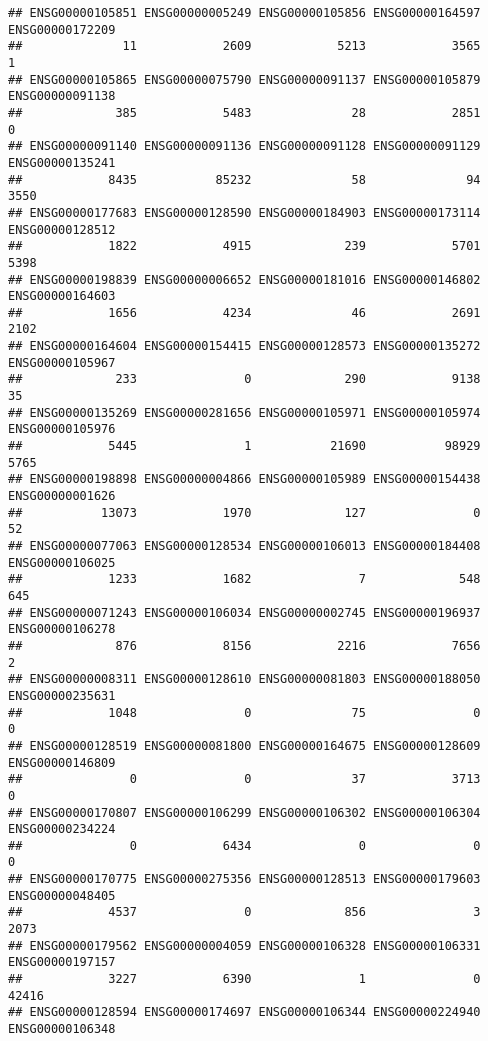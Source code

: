 \documentclass[
]{article}
\begin{document}
\begin{verbatim}
## ENSG00000105851 ENSG00000005249 ENSG00000105856 ENSG00000164597 ENSG00000172209 
##              11            2609            5213            3565               1 
## ENSG00000105865 ENSG00000075790 ENSG00000091137 ENSG00000105879 ENSG00000091138 
##             385            5483              28            2851               0 
## ENSG00000091140 ENSG00000091136 ENSG00000091128 ENSG00000091129 ENSG00000135241 
##            8435           85232              58              94            3550 
## ENSG00000177683 ENSG00000128590 ENSG00000184903 ENSG00000173114 ENSG00000128512 
##            1822            4915             239            5701            5398 
## ENSG00000198839 ENSG00000006652 ENSG00000181016 ENSG00000146802 ENSG00000164603 
##            1656            4234              46            2691            2102 
## ENSG00000164604 ENSG00000154415 ENSG00000128573 ENSG00000135272 ENSG00000105967 
##             233               0             290            9138              35 
## ENSG00000135269 ENSG00000281656 ENSG00000105971 ENSG00000105974 ENSG00000105976 
##            5445               1           21690           98929            5765 
## ENSG00000198898 ENSG00000004866 ENSG00000105989 ENSG00000154438 ENSG00000001626 
##           13073            1970             127               0              52 
## ENSG00000077063 ENSG00000128534 ENSG00000106013 ENSG00000184408 ENSG00000106025 
##            1233            1682               7             548             645 
## ENSG00000071243 ENSG00000106034 ENSG00000002745 ENSG00000196937 ENSG00000106278 
##             876            8156            2216            7656               2 
## ENSG00000008311 ENSG00000128610 ENSG00000081803 ENSG00000188050 ENSG00000235631 
##            1048               0              75               0               0 
## ENSG00000128519 ENSG00000081800 ENSG00000164675 ENSG00000128609 ENSG00000146809 
##               0               0              37            3713               0 
## ENSG00000170807 ENSG00000106299 ENSG00000106302 ENSG00000106304 ENSG00000234224 
##               0            6434               0               0               0 
## ENSG00000170775 ENSG00000275356 ENSG00000128513 ENSG00000179603 ENSG00000048405 
##            4537               0             856               3            2073 
## ENSG00000179562 ENSG00000004059 ENSG00000106328 ENSG00000106331 ENSG00000197157 
##            3227            6390               1               0           42416 
## ENSG00000128594 ENSG00000174697 ENSG00000106344 ENSG00000224940 ENSG00000106348 

\end{verbatim}
\end{document}
